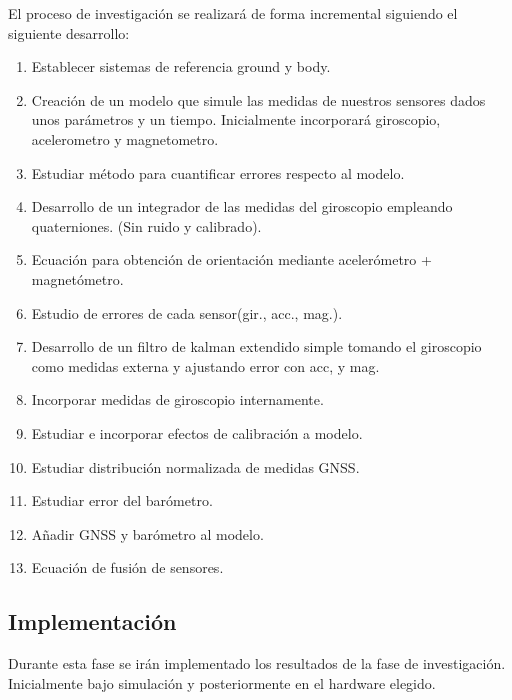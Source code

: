 \documentclass{sty/propuesta}
\begin{document}
El proceso de investigación se realizará de forma incremental siguiendo el siguiente desarrollo:

\begin{enumerate}
    \item Establecer sistemas de referencia ground y body. \cite[sec.~1.2 - 1.4]{gomez2012mecanica}
    \item Creación de un modelo que simule las medidas de nuestros sensores dados unos parámetros y un tiempo. Inicialmente incorporará giroscopio, acelerometro y magnetometro.
    \item Estudiar método para cuantificar errores respecto al modelo.
    \item Desarrollo de un integrador de las medidas del giroscopio empleando quaterniones. (Sin ruido y calibrado).\cite{AshwinNarayan2017Sep}
    \item Ecuación para obtención de orientación mediante acelerómetro + magnetómetro.
    \item Estudio de errores de cada sensor(gir., acc., mag.).
    \item Desarrollo de un filtro de kalman extendido simple tomando el giroscopio como medidas externa y ajustando error con acc, y mag.\cite{BibEntry2024Oct}
    \item Incorporar medidas de giroscopio internamente.
    \item Estudiar e incorporar efectos de calibración a modelo.
    \item Estudiar distribución normalizada de medidas GNSS.
    \item Estudiar error del barómetro.
    \item Añadir GNSS y barómetro al modelo.
    \item Ecuación de fusión de sensores.\cite{Becker_2023}
\end{enumerate}

\subsection{Implementación}

Durante esta fase se irán implementado los resultados de la fase de investigación. Inicialmente bajo simulación y posteriormente en el hardware elegido.
\end{document}
